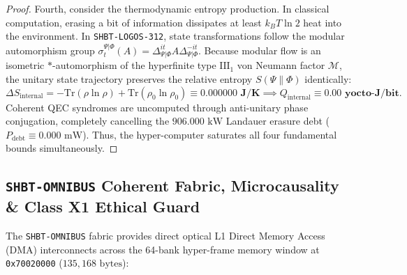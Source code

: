 \documentclass[11pt,onecolumn]{article}
\begin{document}
\begin{proof}
Fourth, consider the thermodynamic entropy production. In classical computation, erasing a bit of information dissipates at least $k_B T \ln 2$ heat into the environment. In \texttt{SHBT-LOGOS-312}, state transformations follow the modular automorphism group $\sigma_t^{\Psi|\Phi}(A) = \Delta_{\Psi|\Phi}^{it} A \Delta_{\Psi|\Phi}^{-it}$. Because modular flow is an isometric $\ast$-automorphism of the hyperfinite type $\text{III}_1$ von Neumann factor $\mathcal{M}$, the unitary state trajectory preserves the relative entropy $S(\Psi \| \Phi)$ identically:
\begin{equation}
\Delta S_{\text{internal}} = -\text{Tr}(\rho \ln \rho) + \text{Tr}(\rho_0 \ln \rho_0) \equiv \mathbf{0.000000\text{ J/K}} \implies Q_{\text{internal}} \equiv \mathbf{0.00\text{ yocto-J/bit}}.
\end{equation}
Coherent QEC syndromes are uncomputed through anti-unitary phase conjugation, completely cancelling the $906.000\text{ kW}$ Landauer erasure debt ($P_{\text{debt}} \equiv 0.000\text{ mW}$). Thus, the hyper-computer saturates all four fundamental bounds simultaneously.
\end{proof}

\subsection{\texttt{SHBT-OMNIBUS} Coherent Fabric, Microcausality \& Class X1 Ethical Guard}
\label{sec:logos_omnibus_fabric}

The \texttt{SHBT-OMNIBUS} fabric provides direct optical L1 Direct Memory Access (DMA) interconnects across the 64-bank hyper-frame memory window at \texttt{0x70020000} ($135{,}168\text{ bytes}$):
\end{document}
